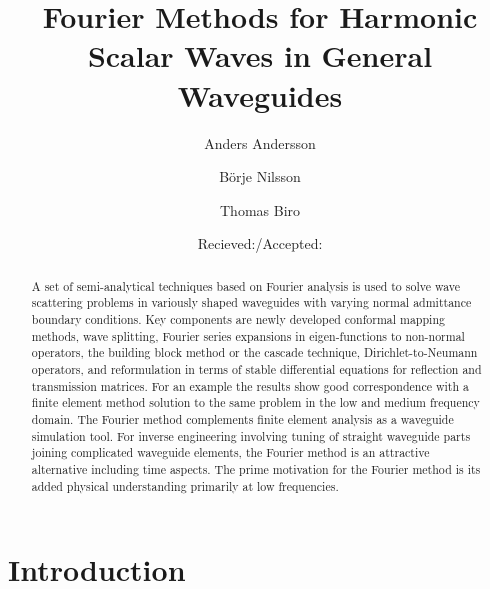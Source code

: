\documentclass{svjour3}
\begin{document}
\title{Fourier Methods for Harmonic Scalar Waves in General
    Waveguides}
\author{Anders Andersson\and B\"orje Nilsson\and Thomas Biro}

\date{Recieved:/Accepted:}
\maketitle
\begin{abstract}
  A set of semi-analytical techniques based on Fourier analysis is
  used to solve wave scattering problems in variously shaped
  waveguides with varying normal admittance boundary conditions. Key
  components are newly developed conformal mapping methods, wave
  splitting, Fourier series expansions in eigen-functions to
  non-normal operators, the building block method or the cascade
  technique, Dirichlet-to-Neumann operators, and reformulation in
  terms of stable differential equations for reflection and
  transmission matrices. For an example the results show good
  correspondence with a finite element method solution to the same
  problem in the low and medium frequency domain. The Fourier method
  complements finite element analysis as a waveguide simulation tool.
  For inverse engineering involving tuning of straight waveguide parts
  joining complicated waveguide elements, the Fourier method is an
  attractive alternative including time aspects. The prime motivation
  for the Fourier method is its added physical understanding primarily
  at low frequencies.
\end{abstract}

\section{Introduction}
\label{sec:intro}
\end{document}
